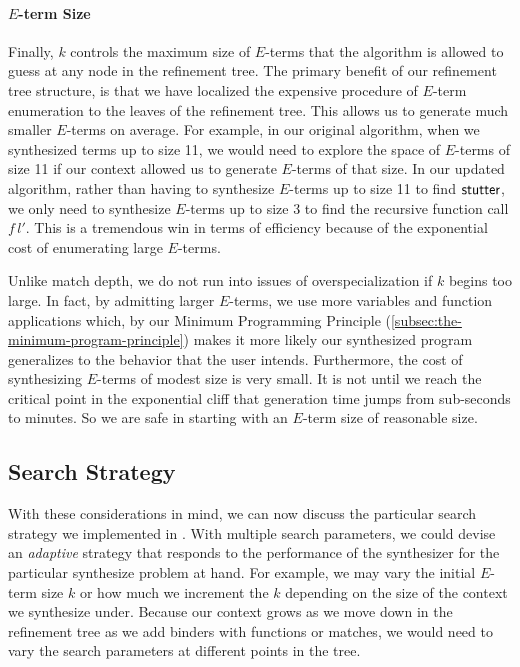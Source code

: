 \paragraph{$E$-term Size}
Finally, $k$ controls the maximum size of $E$-terms that the algorithm is allowed to guess at any node in the refinement tree.
The primary benefit of our refinement tree structure, is that we have localized the expensive procedure of $E$-term enumeration to the leaves of the refinement tree.
This allows us to generate much smaller $E$-terms on average.
For example, in our original algorithm, when we synthesized terms up to size 11, we would need to explore the space of $E$-terms of size 11 if our context allowed us to generate $E$-terms of that size.
In our updated algorithm, rather than having to synthesize $E$-terms up to size 11 to find $\mathsf{stutter}$, we only need to synthesize $E$-terms up to size 3 to find the recursive function call $f\,l'$.
This is a tremendous win in terms of efficiency because of the exponential cost of enumerating large $E$-terms.

Unlike match depth, we do not run into issues of overspecialization if $k$ begins too large.
In fact, by admitting larger $E$-terms, we use more variables and function applications which, by our Minimum Programming Principle (\autoref{subsec:the-minimum-program-principle}) makes it more likely our synthesized program generalizes to the behavior that the user intends.
Furthermore, the cost of synthesizing $E$-terms of modest size is very small.
It is not until we reach the critical point in the exponential cliff that generation time jumps from sub-seconds to minutes.
So we are safe in starting with an $E$-term size of reasonable size.

\subsection{Search Strategy}

With these considerations in mind, we can now discuss the particular search strategy we implemented in \myth{}.
With multiple search parameters, we could devise an \emph{adaptive} strategy that responds to the performance of the synthesizer for the particular synthesize problem at hand.
For example, we may vary the initial $E$-term size $k$ or how much we increment the $k$ depending on the size of the context we synthesize under.
Because our context grows as we move down in the refinement tree as we add binders with functions or matches, we would need to vary the search parameters at different points in the tree.

